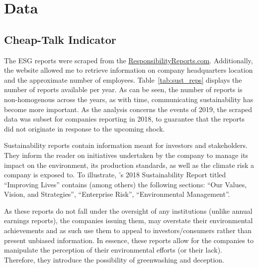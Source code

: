 \documentclass[12pt]{article}
\begin{document}
\newpage

\section{Data}\label{sect:data}

\subsection{Cheap-Talk Indicator}

The ESG reports were scraped from the \href{https://responsibilityreports.com}{ResponsibilityReports.com}. Additionally, the website allowed me to retrieve information on company headquarters location and the approximate number of employees. Table~\ref{tab:sust_reps} displays the number of reports available per year. As can be seen, the number of reports is non-homogenous across the years, as with time, communicating sustainability has become more important. As the analysis concerns the events of 2019, the scraped data was subset for companies reporting in 2018, to guarantee that the reports did not originate in response to the upcoming shock. 


    
Sustainability reports contain information meant for investors and stakeholders. They inform the reader on initiatives undertaken by the company to manage its impact on the environment, its production standards, as well as the climate risk a company is exposed to. To illustrate, \citeauthor{3m2018sustainability}'s 2018 Sustainability Report titled ``Improving Lives'' contains (among others) the following sections:  ``Our Values, Vision, and Strategies'', ``Enterprise Risk'', ``Environmental Management''.

As these reports do not fall under the oversight of any institutions (unlike annual earnings reports), the companies issuing them, may overstate their environmental achievements and as such use them to appeal to investors/consumers rather than present unbiased information. In essence, these reports allow for the companies to manipulate the perception of their environmental efforts (or their lack). Therefore, they introduce the possibility of greenwashing and deception. 
\end{document}
